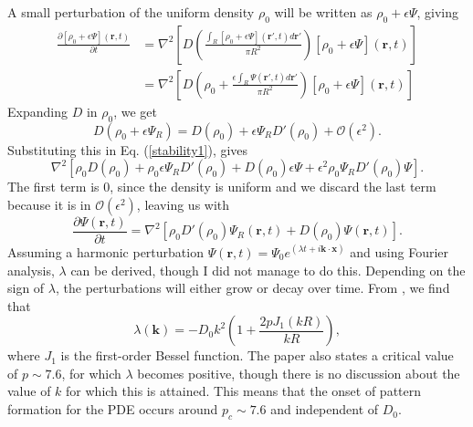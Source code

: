 \documentclass{article}
\renewcommand{\vec}[1]{\boldsymbol{#1}}
\begin{document}
A small perturbation of the uniform density $\rho_0$ will be written as $\rho_0 + \epsilon \Psi$, giving
\begin{align}
    \frac{\partial[\rho_0 + \epsilon \Psi](\vec{r},t)}{\partial t} &= \nabla^2\left[D\left(\frac{\int_{R} [\rho_0+\epsilon \Psi](\vec{r}',t)d\vec{r}'}{\pi R^2}\right)[\rho_0+\epsilon \Psi](\vec{r},t)\right]\\
    &= \nabla^2\left[D\left(\rho_0+\frac{\epsilon\int_{R} \Psi(\vec{r}',t)d\vec{r}'}{\pi R^2}\right)[\rho_0+\epsilon \Psi](\vec{r},t)\right] \label{stability1}
\end{align}
Expanding $D$ in $\rho_0$, we get 
\begin{equation}
    D(\rho_0+\epsilon \Psi_R) = D(\rho_0) + \epsilon \Psi_R D'(\rho_0) + \mathcal{O}(\epsilon^2).
\end{equation}
Substituting this in Eq. (\ref{stability1}), gives
\begin{equation}
\nabla^2\left[\rho_0 D(\rho_0) + \rho_0\epsilon \Psi_R D'(\rho_0)+ D(\rho_0)\epsilon \Psi + \epsilon^2 \rho_0 \Psi_R D'(\rho_0) \Psi\right].
\end{equation}
The first term is $0$, since the density is uniform and we discard the last term because it is in $\mathcal{O}(\epsilon^2)$, leaving us with
\begin{equation}
    \frac{\partial \Psi(\vec{r},t)}{\partial t} = \nabla^2\left[ \rho_0  D'(\rho_0)\Psi_R(\vec{r},t)+ D(\rho_0) \Psi(\vec{r},t) \right].
\end{equation}
Assuming a harmonic perturbation $\Psi(\vec{r}, t) = \Psi_0 e^{(\lambda t + i \vec{k} \cdot \vec{x})}$ and using Fourier analysis, $\lambda$ can be derived, though I did not manage to do this.
Depending on the sign of $\lambda$, the perturbations will either grow or decay over time.
From \cite{lopezMacroscopicDescriptionParticle2006}, we find that 
\begin{equation}
    \lambda(\vec{k}) = -D_0 k^2\left(1 + \frac{2pJ_1(kR)}{kR}\right),
\end{equation}
where $J_1$ is the first-order Bessel function.
The paper also states a critical value of $p\sim 7.6$, for which $\lambda $ becomes positive, though there is no discussion about the value of $k$ for which this is attained. 
This means that the onset of pattern formation for the PDE occurs around $p_c \sim 7.6$ and independent of $D_0$.
\end{document}
